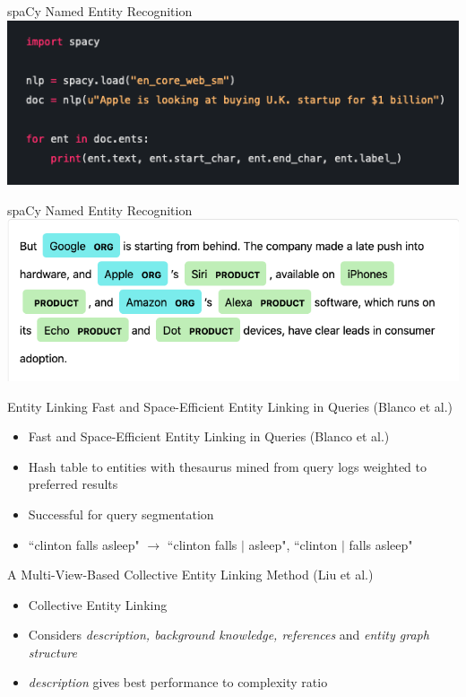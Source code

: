 \documentclass{beamer}
\begin{document}
\begin{frame}{spaCy Named Entity Recognition}
	\includegraphics[width=\linewidth]{spacy-code.png}
\end{frame}

\begin{frame}{spaCy Named Entity Recognition}
	\includegraphics[width=\linewidth]{spacy-result.png}
\end{frame}

\begin{frame}{Entity Linking}
	Fast and Space-Efficient Entity Linking in Queries (Blanco et al.)
	\begin{itemize}
		\item Fast and Space-Efficient Entity Linking in Queries (Blanco et al.)
		\item Hash table to entities with thesaurus mined from query logs weighted to preferred results
		\item Successful for query segmentation
		\item ``clinton falls asleep" $\rightarrow$ ``clinton falls $\vert$ asleep", ``clinton $\vert$ falls asleep"
	\end{itemize}
	A Multi-View-Based Collective Entity Linking Method (Liu et al.)
	\begin{itemize}
		\item Collective Entity Linking
		\item Considers \textit{description, background knowledge, references} and \textit{entity graph structure}
		\item \textit{description} gives best performance to complexity ratio
	\end{itemize}
\end{frame}
\end{document}
